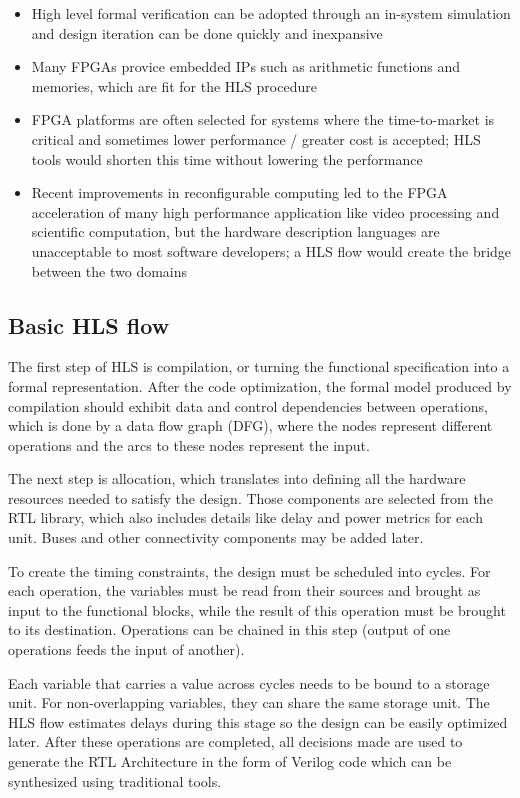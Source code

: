 \documentclass{romjist}
\begin{document}
\begin{itemize} 
  \item High level formal verification can be adopted through an in-system simulation and design iteration can be done quickly and inexpansive
  \item Many FPGAs provice embedded IPs such as arithmetic functions and memories, which are fit for the HLS procedure
  \item FPGA platforms are often selected for systems where the time-to-market is critical and sometimes lower performance / greater cost is accepted; HLS tools would shorten this time without lowering the performance
  \item Recent improvements in reconfigurable computing led to the FPGA acceleration of many high performance application like video processing and scientific computation, but the hardware description languages are unacceptable to most software developers; a HLS flow would create the bridge between the two domains
\end{itemize}






\subsection{Basic HLS flow} 
\quad The first step of HLS is compilation, or turning the functional specification into a formal representation. After the code optimization, the formal model produced by compilation should exhibit data and control dependencies between operations, which is done by a data flow graph (DFG), where the nodes represent different operations and the arcs to these nodes represent the input. 


\quad The next step is allocation, which translates into defining all the hardware resources needed to satisfy the design. Those components are selected from the RTL library, which also includes details like delay and power metrics for each unit. Buses and other connectivity components may be added later. 


\quad To create the timing constraints, the design must be scheduled into cycles. For each operation, the variables must be read from their sources and brought as input to the functional blocks, while the result of this operation must be brought to its destination. Operations can be chained in this step (output of one operations feeds the input of another). 


\quad Each variable that carries a value across cycles needs to be bound to a storage unit. For non-overlapping variables, they can share the same storage unit. The HLS flow estimates delays during this stage so the design can be easily optimized later. 
After these operations are completed, all decisions made are used to generate the RTL Architecture in the form of Verilog code which can be synthesized using traditional tools. 
\end{document}
